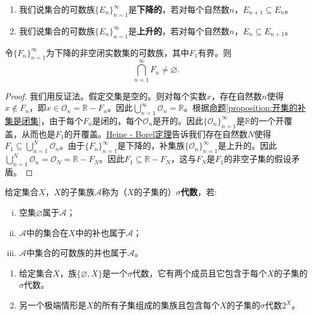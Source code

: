 \documentclass[lang=cn,newtx,10pt,scheme=chinese]{elegantbook}
\begin{document}
\begin{definition}[集族的下降与上升]\label{definition:集族的下降与上升}
\begin{enumerate}
  \item 我们说集合的可数族\(\{E_n\}_{n = 1}^{\infty}\)是\textbf{下降的}，若对每个自然数\(n\)，\(E_{n + 1}\subseteq E_n\)。

  \item 我们说集合的可数族\(\{E_n\}_{n = 1}^{\infty}\)是\textbf{上升的}，若对每个自然数\(n\)，\(E_n\subseteq E_{n + 1}\)。
\end{enumerate}
\end{definition}

\begin{theorem}[集套定理]\label{theorem:集套定理}
  令\(\{F_n\}_{n = 1}^{\infty}\)为下降的非空闭实数集的可数族，其中\(F_1\)有界。则
\[\bigcap_{n = 1}^{\infty}F_n\neq\varnothing.\]
\end{theorem}
\begin{proof}
  我们用反证法。假定交集是空的。则对每个实数\(x\)，存在自然数\(n\)使得\(x\notin F_n\)，即\(x\in\mathcal{O}_n=\mathbb{R}- F_n\)。因此\(\bigcup_{n = 1}^{\infty}\mathcal{O}_n=\mathbb{R}\)。根据\hyperref[proposition:开集的补集是闭集]{命题\ref{proposition:开集的补集是闭集}}，由于每个\(F_n\)是闭的，每个\(\mathcal{O}_n\)是开的。因此\(\{\mathcal{O}_n\}_{n = 1}^{\infty}\)是\(\mathbb{R}\)的一个开覆盖，从而也是\(F_1\)的开覆盖。\hyperref[theorem:Heine - Borel定理]{Heine - Borel定理}告诉我们存在自然数\(N\)使得\(F_1\subseteq\bigcup_{n = 1}^{N}\mathcal{O}_n\)。由于\(\{F_n\}_{n = 1}^{\infty}\)是下降的，补集族\(\{\mathcal{O}_n\}_{n = 1}^{\infty}\)是上升的。因此\(\bigcup_{n = 1}^{N}\mathcal{O}_n=\mathcal{O}_N=\mathbb{R}- F_N\)。因此\(F_1\subseteq\mathbb{R}- F_N\)，这与\(F_N\)是\(F_1\)的非空子集的假设矛盾。
\end{proof}

\begin{definition}[$\sigma$代数]\label{definition: sigma 代数}
  给定集合\(X\)，\(X\)的子集族\(\mathcal{A}\)称为（\(X\)的子集的）\textbf{\(\sigma\)代数}，若:
  \begin{enumerate}[(i)]
    \item 空集\(\varnothing\)属于\(\mathcal{A}\)；

    \item \(\mathcal{A}\)中的集合在\(X\)中的补也属于\(\mathcal{A}\)；

    \item \(\mathcal{A}\)中集合的可数族的并也属于\(\mathcal{A}\)。
  \end{enumerate}
\end{definition}
\begin{note}
\begin{enumerate}[(1)]
  \item 给定集合\(X\)，族\(\{\varnothing, X\}\)是一个\(\sigma\)代数，它有两个成员且它包含于每个\(X\)的子集的\(\sigma\)代数。

  \item 另一个极端情形是\(X\)的所有子集组成的集族且包含每个\(X\)的子集的\(\sigma\)代数\(2^X\)。
\end{enumerate}
\end{note}
\end{document}
